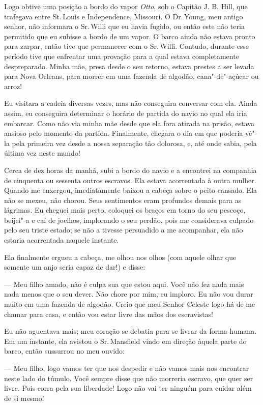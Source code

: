 Logo obtive uma posição a bordo do vapor \emph{Otto}, sob o Capitão J.
B. Hill, que trafegava entre St.\,Louis e Independence, Missouri. O Dr.\,Young, meu antigo senhor, não informara o Sr.\,Willi que eu havia fugido,
ou então este não teria permitido que eu subisse a bordo de um vapor. O
barco ainda não estava pronto para zarpar, então tive que permanecer com
o Sr.\,Willi. Contudo, durante esse período tive que enfrentar uma
provação para a qual estava completamente despreparado. Minha mãe, presa
desde o seu retorno, estava prestes a ser levada para Nova Orleans, para
morrer em uma fazenda de algodão, cana"-de"-açúcar ou arroz!

Eu visitara a cadeia diversas vezes, mas não conseguira conversar com
ela. Ainda assim, eu conseguira determinar o horário de partida do navio
no qual ela iria embarcar. Como não via minha mãe desde que ela fora
atirada na prisão, estava ansioso pelo momento da partida. Finalmente,
chegara o dia em que poderia vê"-la pela primeira vez desde a nossa
separação tão dolorosa, e, até onde sabia, pela última vez neste mundo!

Cerca de dez horas da manhã, subi a bordo do navio e a encontrei na
companhia de cinquenta ou sessenta outros escravos. Ela estava
acorrentada à outra mulher. Quando me enxergou, imediatamente baixou a
cabeça sobre o peito cansado. Ela não se mexeu, não chorou. Seus
sentimentos eram profundos demais para as lágrimas. Eu cheguei mais
perto, coloquei os braços em torno do seu pescoço, beijei"-a e caí de
joelhos, implorando o seu perdão, pois me considerava culpado pelo seu
triste estado; se não a tivesse persuadido a me acompanhar, ela não
estaria acorrentada naquele instante.

Ela finalmente ergueu a cabeça, me olhou nos olhos (com aquele olhar que
somente um anjo seria capaz de dar!) e disse:

--- Meu filho amado, não é culpa sua que estou aqui. Você não fez nada
mais nada menos que o seu dever. Não chore por mim, eu imploro. Eu não
vou durar muito em uma fazenda de algodão. Creio que meu Senhor Celeste
logo há de me chamar para casa, e então vou estar livre das mãos dos
escravistas!

Eu não aguentava mais; meu coração se debatia para se livrar da forma
humana. Em um instante, ela avistou o Sr.\,Mansfield vindo em direção
àquela parte do barco, então sussurrou no meu ouvido:

--- Meu filho, logo vamos ter que nos despedir e não vamos mais nos
encontrar neste lado do túmulo. Você sempre disse que não morreria
escravo, que quer ser livre. Pois corra pela sua liberdade! Logo não vai
ter ninguém para cuidar além de si mesmo!

